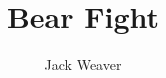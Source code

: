 \documentclass[12pt]{article}
\title{Bear Fight}
\author{Jack Weaver}
\begin{document}
%

\def\al{\alpha}
\def\be{\beta}
\def\ga{\gamma}
\def\Ga{\Gamma}
\def\de{\delta}
\def\De{\Delta}
\def\ep{\varepsilon}
\def\eps{\varepsilon}
\def\ze{\zeta}
\def\th{\theta}
\def\ka{\kappa}
\def\la{\lambda}
\def\La{\Lambda}
\def\vpi{\varpi}
\def\si{\sigma}
\def\Si{\Sigma}
\def\ph{\varphi}
\def\om{\omega}
\def\Om{\Omega}

\def\wt{\widetilde}
\def\wh{\widehat}
\def\wch{\widecheck}
\def\ol{\overline}
\def\ds{\displaystyle}

\def\nab{\nabla}
\def\pa{\partial}
\def\To{\Rightarrow}
\def\eqd{\overset{d}{=}}
\def\emp{\emptyset}

\def\pf{\noindent{\bf Proof.} }
\def\qed{\hfill $\Box$}

\providecommand{\flr}[1]{\left\lfloor{#1}\right\rfloor}
\providecommand{\ceil}[1]{\left\lceil{#1}\right\rceil}
\providecommand{\ang}[1]{\left\langle{#1}\right\rangle}


\def\bA{\mathbb{A}}
\def\bB{\mathbb{B}}
\def\bC{\mathbb{C}}
\def\bD{\mathbb{D}}
\def\bE{\mathbb{E}}
\def\bF{\mathbb{F}}
\def\bG{\mathbb{G}}
\def\bH{\mathbb{H}}
\def\bI{\mathbb{I}}
\def\bJ{\mathbb{J}}
\def\bK{\mathbb{K}}
\def\bL{\mathbb{L}}
\def\bM{\mathbb{M}}
\def\bN{\mathbb{N}}
\def\bO{\mathbb{O}}
\def\bP{\mathbb{P}}
\def\bQ{\mathbb{Q}}
\def\bR{\mathbb{R}}
\def\bS{\mathbb{S}}
\def\bT{\mathbb{T}}
\def\bU{\mathbb{U}}
\def\bV{\mathbb{V}}
\def\bW{\mathbb{W}}
\def\bX{\mathbb{X}}
\def\bY{\mathbb{Y}}
\def\bZ{\mathbb{Z}}

\def\bfA{{\bf A}}
\def\bfB{{\bf B}}
\def\bfC{{\bf C}}
\def\bfD{{\bf D}}
\def\bfE{{\bf E}}
\def\bfF{{\bf F}}
\def\bfG{{\bf G}}
\def\bfH{{\bf H}}
\def\bfI{{\bf I}}
\def\bfJ{{\bf J}}
\def\bfK{{\bf K}}
\def\bfL{{\bf L}}
\def\bfM{{\bf M}}
\def\bfN{{\bf N}}
\def\bfO{{\bf O}}
\def\bfP{{\bf P}}
\def\bfQ{{\bf Q}}
\def\bfR{{\bf R}}
\def\bfS{{\bf S}}
\def\bfT{{\bf T}}
\def\bfU{{\bf U}}
\def\bfV{{\bf V}}
\def\bfW{{\bf W}}
\def\bfX{{\bf X}}
\def\bfY{{\bf Y}}
\def\bfZ{{\bf Z}}
\end{document}
